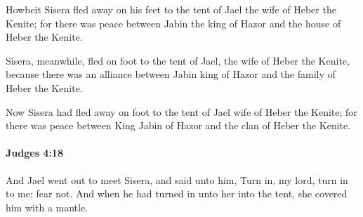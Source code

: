 			\begin{versebox}
					\item[BHS] 
					\item[ASV] Howbeit Sisera fled away on his feet to the tent of Jael the wife of Heber the Kenite; for there was peace between Jabin the king of Hazor and the house of Heber the Kenite.
					\item[NIV] Sisera, meanwhile, fled on foot to the tent of Jael, the wife of Heber the Kenite, because there was an alliance between Jabin king of Hazor and the family of Heber the Kenite.
					\item[NRSV] Now Sisera had fled away on foot to the tent of Jael wife of Heber the Kenite; for there was peace between King Jabin of Hazor and the clan of Heber the Kenite.
			\end{versebox}

		\paragraph{Judges 4:18} %
			\label{JUDGES-4-18}

			And Jael went out to meet Sisera, and said unto him, Turn in, my lord, turn in to me; fear not. And when he had turned in unto her into the tent, she covered him with a mantle.

